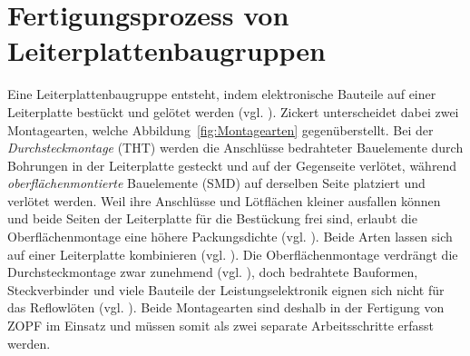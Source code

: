 \section{Fertigungsprozess von Leiterplattenbaugruppen}
\label{sec:Fertigungsprozess}
Eine Leiterplattenbaugruppe entsteht, indem elektronische Bauteile auf einer
Leiterplatte bestückt und gelötet werden (vgl.
\cite[S.~156]{zickertLeiterplatten2023}). Zickert unterscheidet dabei zwei
Montagearten, welche Abbildung~\ref{fig:Montagearten} gegenüberstellt. Bei der
\emph{Durchsteckmontage} (THT) werden die Anschlüsse bedrahteter Bauelemente
durch Bohrungen in der Leiterplatte gesteckt und auf der Gegenseite verlötet,
während \emph{oberflächenmontierte} Bauelemente (SMD) auf derselben Seite
platziert und verlötet werden. Weil ihre Anschlüsse und Lötflächen kleiner
ausfallen können und beide Seiten der Leiterplatte für die Bestückung frei
sind, erlaubt die Oberflächenmontage eine höhere Packungsdichte (vgl.
\cite[S.~65\,f.]{zickertLeiterplatten2023}). Beide Arten lassen sich auf einer
Leiterplatte kombinieren (vgl. \cite[S.~92]{zickertLeiterplatten2023}). Die
Oberflächenmontage verdrängt die Durchsteckmontage zwar zunehmend (vgl.
\cite[S.~66]{zickertLeiterplatten2023}), doch bedrahtete Bauformen,
Steckverbinder und viele Bauteile der Leistungselektronik eignen sich nicht für
das Reflowlöten (vgl. \cite[S.~167]{zickertLeiterplatten2023}). 
Beide Montagearten sind deshalb in der Fertigung von ZOPF im Einsatz und müssen somit 
als zwei separate Arbeitsschritte erfasst werden.


